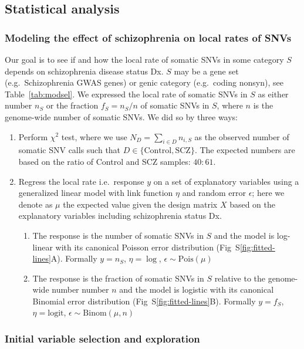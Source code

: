\documentclass[letterpaper]{article}
\begin{document}
\subsection*{Statistical analysis}

\subsubsection*{Modeling the effect of schizophrenia on local rates of SNVs}

Our goal is to see if and how the local rate of somatic SNVs in some category $S$
depends on schizophrenia disease status Dx.  $S$ may be a gene set
(e.g.~Schizophrenia GWAS genes) or genic category (e.g.~coding nonsyn), see
Table~\ref{tab:modsel}.  We expressed the local rate of somatic SNVs in $S$ as
either number $n_S$ or the fraction $f_S = n_S / n$ of somatic SNVs in $S$,
where $n$ is the genome-wide number of somatic SNVs.  
We did so by three ways:
\begin{enumerate}
\item Perform $\chi^2$ test, where we use $N_D = \sum_{i\in D} n_{i,S}$ as the observed number
	of somatic SNV calls such that $D \in \{\mathrm{Control},
	\mathrm{SCZ}\}$.  The expected numbers are based on the ratio of
	Control and SCZ samples: $40:61$.
\item Regress the local rate i.e.~response $y$ on a set of explanatory variables
	using a generalized linear model with link function $\eta$ and random error
	$\epsilon$; here we denote as $\mu$
	the expected value given the design matrix $X$ based on the
	explanatory variables including schizophrenia status Dx.
\begin{enumerate}
\item The response is the number of somatic SNVs in $S$ and the model is
	log-linear with its canonical Poisson error distribution
	(Fig~S\ref{fig:fitted-lines}A).  Formally $y
	= n_S$, $\eta = \log$, $\epsilon \sim \mathrm{Pois}(\mu)$
\item The response is the fraction of somatic SNVs in $S$ relative to the
	genome-wide number number $n$ and the model is
	logistic with its canonical Binomial error distribution (Fig~S\ref{fig:fitted-lines}B).  Formally $y
	= f_S$, $\eta = \mathrm{logit}$, $\epsilon \sim \mathrm{Binom}(\mu, n)$
\end{enumerate}
\end{enumerate}

\subsubsection*{Initial variable selection and exploration}
\end{document}
